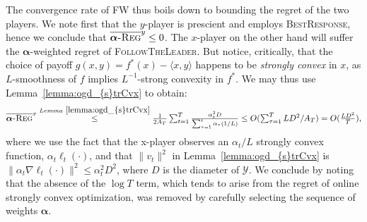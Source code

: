 \documentclass[pmlr]{jmlr} %
\def\K{\mathcal{K}}
\def\balpha{\boldsymbol{\alpha}}
\def\FTL{\textsc{FollowTheLeader}\xspace}
\def\BR{\textsc{BestResponse}\xspace}
\newcommand{\avgregret}[1]{\overline{\balpha\textsc{-Reg}}^{#1}}
\newcommand{\YY}{\mathcal{Y}}
\begin{document}
The convergence rate of FW thus boils down to bounding the regret of the two players. We note first that the $y$-player is prescient and employs \BR,  hence we conclude that $\avgregret{y} \leq 0$. The $x$-player on the other hand will suffer the $\balpha$-weighted regret of \FTL. But notice, critically, that the choice of payoff $g(x,y) = f^{*}(x) - \langle x, y \rangle$ happens to be \emph{strongly convex} in $x$, as $L$-smoothness of $f$ implies $L^{-1}$-strong convexity in $f^{*}$. We may thus use Lemma~\ref{lemma:ogd_{s}trCvx} to obtain:
\[
	\textstyle \avgregret{x} \overset{Lemma~\ref{lemma:ogd_{s}trCvx}}{\leq} \frac 1 {2 A_{T}} \sum_{t=1}^{T} \frac{ \alpha_{t}^{2} D }{ \sum_{\tau=1}^{t} \alpha_{\tau} (1/L)}  \leq  O( \sum_{\tau=1}^{T} L D^{2}  /A_{T})  = O( \frac{LD^{2}}{T} ),
 \]
where we use the fact that the x-player observes an $\alpha_{t}/L$ strongly convex function, $\alpha_{t} \ell_{t}(\cdot)$, and that
$\| v_{t}\|^{2}$ in Lemma~\ref{lemma:ogd_{s}trCvx} is $\| \alpha_{t}  \nabla \ell_{t}(\cdot)\|^{2}\leq \alpha_{t}^{2} D^{2}$, where $D$ is the diameter of $\YY$.
We conclude by noting that the absence of the $\log T$ term, which tends to arise from the regret of online strongly convex optimization, was removed by carefully selecting the sequence of weights $\balpha$.


\end{document}
